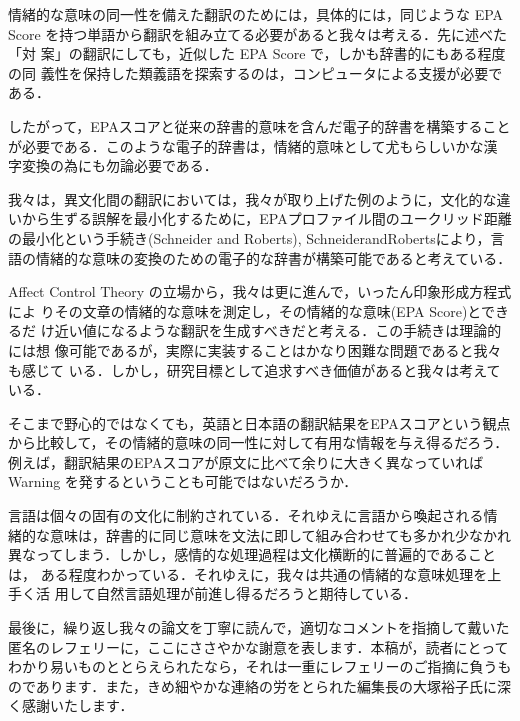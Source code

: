 \documentclass[japanese]{jnlp_1.3d}
\newcommand{\citep}{}
\begin{document}
情緒的な意味の同一性を備えた翻訳のためには，具体的には，同じような EPA
Score を持つ単語から翻訳を組み立てる必要があると我々は考える．先に述べた「対
案」の翻訳にしても，近似した EPA Score で，しかも辞書的にもある程度の同
義性を保持した類義語を探索するのは，コンピュータによる支援が必要である．

したがって，EPAスコアと従来の辞書的意味を含んだ電子的辞書を構築すること
が必要である．このような電子的辞書は，情緒的意味として尤もらしいかな漢
字変換の為にも勿論必要である．


我々は，異文化間の翻訳においては，我々が取り上げた例のように，文化的な違
いから生ずる誤解を最小化するために，EPAプロファイル間のユークリッド距離
の最小化という手続き(Schneider and Roberts), \citep{SchneiderandRoberts}により，言語の情緒的な意味の変換のための電子的な辞書が構築可能であると考えている．


Affect Control Theory の立場から，我々は更に進んで，いったん印象形成方程式によ
りその文章の情緒的な意味を測定し，その情緒的な意味(EPA Score)とできるだ
け近い値になるような翻訳を生成すべきだと考える．この手続きは理論的には想
像可能であるが，実際に実装することはかなり困難な問題であると我々も感じて
いる．しかし，研究目標として追求すべき価値があると我々は考えている．

そこまで野心的ではなくても，英語と日本語の翻訳結果をEPAスコアという観点
から比較して，その情緒的意味の同一性に対して有用な情報を与え得るだろう．
例えば，翻訳結果のEPAスコアが原文に比べて余りに大きく異なっていれば Warning を発するということも可能ではないだろうか．


言語は個々の固有の文化に制約されている．それゆえに言語から喚起される情
緒的な意味は，辞書的に同じ意味を文法に即して組み合わせても多かれ少なかれ
異なってしまう．しかし，感情的な処理過程は文化横断的に普遍的であることは，
ある程度わかっている．それゆえに，我々は共通の情緒的な意味処理を上手く活
用して自然言語処理が前進し得るだろうと期待している．

\acknowledgment

最後に，繰り返し我々の論文を丁寧に読んで，適切なコメントを指摘して戴いた
匿名のレフェリーに，ここにささやかな謝意を表します．本稿が，読者にとって
わかり易いものととらえられたなら，それは一重にレフェリーのご指摘に負うも
のであります．また，きめ細やかな連絡の労をとられた編集長の大塚裕子氏に深く感謝いたします． 





\nocite{SMI}
\nocite{SIL}

\nocite{Osgood}
\nocite{Osgood1}
\nocite{Osgood2}
\end{document}
